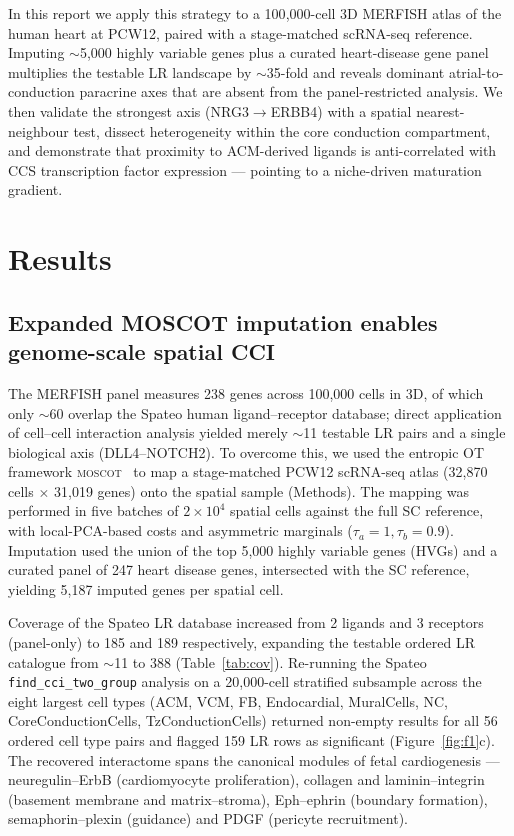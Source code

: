 \documentclass[11pt,a4paper]{article}
\begin{document}
In this report we apply this strategy to a 100{,}000-cell 3D MERFISH
atlas of the human heart at PCW12, paired with a stage-matched scRNA-seq
reference. Imputing $\sim$5{,}000 highly variable genes plus a curated
heart-disease gene panel multiplies the testable LR landscape by
$\sim$35-fold and reveals dominant atrial-to-conduction paracrine axes
that are absent from the panel-restricted analysis. We then validate
the strongest axis (NRG3$\to$ERBB4) with a spatial nearest-neighbour
test, dissect heterogeneity within the core conduction compartment, and
demonstrate that proximity to ACM-derived ligands is anti-correlated
with CCS transcription factor expression --- pointing to a niche-driven
maturation gradient.

\section{Results}

\subsection{Expanded MOSCOT imputation enables genome-scale spatial CCI}
\label{sec:imputation}

The MERFISH panel measures 238 genes across 100{,}000 cells in 3D, of
which only $\sim$60 overlap the Spateo human ligand--receptor database;
direct application of cell--cell interaction analysis yielded merely
$\sim$11 testable LR pairs and a single biological axis (DLL4--NOTCH2).
To overcome this, we used the entropic OT framework
\textsc{moscot}~\citep{klein2025moscot} to map a stage-matched PCW12
scRNA-seq atlas (32{,}870 cells $\times$ 31{,}019 genes) onto the
spatial sample (Methods). The mapping was performed in five batches of
$2 \times 10^4$ spatial cells against the full SC reference, with
local-PCA-based costs and asymmetric marginals
($\tau_a{=}1, \tau_b{=}0.9$). Imputation used the union of the top
5{,}000 highly variable genes (HVGs) and a curated panel of 247 heart
disease genes, intersected with the SC reference, yielding 5{,}187
imputed genes per spatial cell.

Coverage of the Spateo LR database increased from 2 ligands and 3
receptors (panel-only) to 185 and 189 respectively, expanding the
testable ordered LR catalogue from $\sim$11 to 388 (Table~\ref{tab:cov}).
Re-running the Spateo \texttt{find\_cci\_two\_group} analysis on a
20{,}000-cell stratified subsample across the eight largest cell types
(ACM, VCM, FB, Endocardial, MuralCells, NC, CoreConductionCells,
TzConductionCells) returned non-empty results for all 56 ordered cell
type pairs and flagged 159 LR rows as significant
(Figure~\ref{fig:f1}c). The recovered interactome spans the canonical
modules of fetal cardiogenesis --- neuregulin--ErbB (cardiomyocyte
proliferation), collagen and laminin--integrin (basement membrane and
matrix--stroma), Eph--ephrin (boundary formation), semaphorin--plexin
(guidance) and PDGF (pericyte recruitment).
\end{document}
